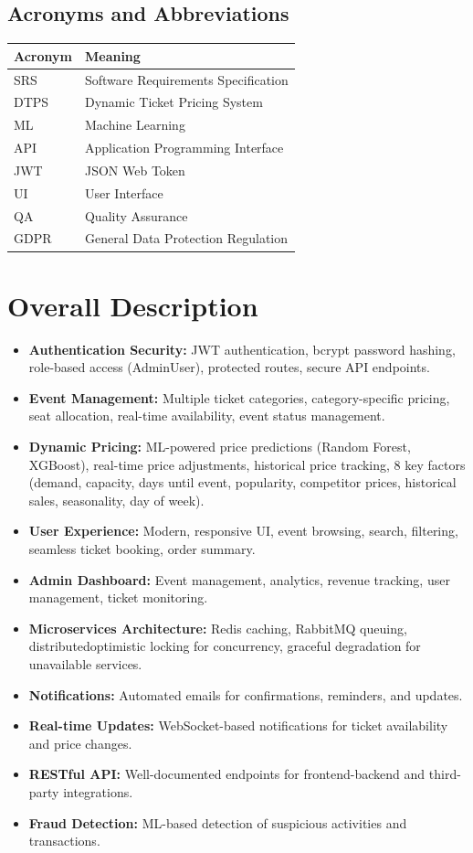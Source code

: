 \documentclass[11pt,a4paper]{article}
\begin{document}
\subsection{Acronyms and Abbreviations}

\begin{longtable}{|p{3cm}|p{10cm}|}
\hline
\textbf{Acronym} & \textbf{Meaning} \\
\hline
SRS & Software Requirements Specification \\
\hline
DTPS & Dynamic Ticket Pricing System \\
\hline
ML & Machine Learning \\
\hline
API & Application Programming Interface \\
\hline
JWT & JSON Web Token \\
\hline
UI & User Interface \\
\hline
QA & Quality Assurance \\
\hline
GDPR & General Data Protection Regulation \\
\hline
\end{longtable}

\section{Overall Description}
\begin{itemize}
     \item \textbf{Authentication \/ Security:} JWT authentication, bcrypt password hashing, role-based access (Admin\/User), protected routes, secure API endpoints.
     \item \textbf{Event Management:} Multiple ticket categories, category-specific pricing, seat allocation, real-time availability, event status management.
     \item \textbf{Dynamic Pricing:} ML-powered price predictions (Random Forest, XGBoost), real-time price adjustments, historical price tracking, 8 key factors (demand, capacity, days until event, popularity, competitor prices, historical sales, seasonality, day of week).
     \item \textbf{User Experience:} Modern, responsive UI, event browsing, search, filtering, seamless ticket booking, order summary.
     \item \textbf{Admin Dashboard:} Event management, analytics, revenue tracking, user management, ticket monitoring.
     \item \textbf{Microservices Architecture:} Redis caching, RabbitMQ queuing, distributed\/optimistic locking for concurrency, graceful degradation for unavailable services.
     \item \textbf{Notifications:} Automated emails for confirmations, reminders, and updates.
     \item \textbf{Real-time Updates:} WebSocket-based notifications for ticket availability and price changes.
     \item \textbf{RESTful API:} Well-documented endpoints for frontend-backend and third-party integrations.
     \item \textbf{Fraud Detection:} ML-based detection of suspicious activities and transactions.
\end{itemize}
\end{document}
